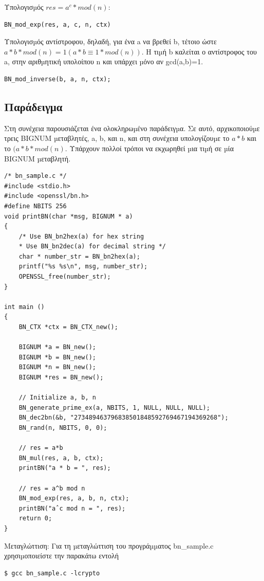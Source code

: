 \noindent
Υπολογισµός \(res = a^c * mod(n):\)
\begin{center}
	\begin{lstlisting}	
BN_mod_exp(res, a, c, n, ctx)	
	\end{lstlisting}	
\end{center}

\noindent
Υπολογισµός αντίστροφου, δηλαδή, για ένα a να βρεθεί b, τέτοιο ώστε \(a * b * mod(n) = 1
(a * b ≡ 1 * mod(n))\). Η τιµή b καλείται ο αντίστροφος του a, στην αριθµητική υπολοίπου
n και υπάρχει µόνο αν gcd(a,b)=1.
\begin{center}
	\begin{lstlisting}	
BN_mod_inverse(b, a, n, ctx);
	\end{lstlisting}	
\end{center}

\subsection{Παράδειγμα}

\noindent
Στη συνέχεια παρουσιάζεται ένα ολοκληρωµένο παράδειγµα. Σε αυτό, αρχικοποιούµε τρεις
BIGNUM µεταβλητές, a, b, και n, και στη συνέχεια υπολογίζουµε το \(a*b\) και το \((a * b * mod(n)\).
Υπάρχουν πολλοί τρόποι να εκχωρηθεί µια τιµή σε µία BIGNUM µεταβλητή.
\begin{center}
	\begin{lstlisting}	
/* bn_sample.c */
#include <stdio.h>
#include <openssl/bn.h>
#define NBITS 256
void printBN(char *msg, BIGNUM * a)
{
	/* Use BN_bn2hex(a) for hex string
	* Use BN_bn2dec(a) for decimal string */
	char * number_str = BN_bn2hex(a);
	printf("%s %s\n", msg, number_str);
	OPENSSL_free(number_str);
}
	
int main ()
{
	BN_CTX *ctx = BN_CTX_new();
	
	BIGNUM *a = BN_new();
	BIGNUM *b = BN_new();
	BIGNUM *n = BN_new();
	BIGNUM *res = BN_new();
	
	// Initialize a, b, n
	BN_generate_prime_ex(a, NBITS, 1, NULL, NULL, NULL);
	BN_dec2bn(&b, "273489463796838501848592769467194369268");
	BN_rand(n, NBITS, 0, 0);
	
	// res = a*b
	BN_mul(res, a, b, ctx);
	printBN("a * b = ", res);
	
	// res = a^b mod n
	BN_mod_exp(res, a, b, n, ctx);
	printBN("aˆc mod n = ", res);
	return 0;
}	
	\end{lstlisting}	
\end{center}

Μεταγλώττιση: Για τη µεταγλώττιση του προγράµµατος bn\_sample.c χρησιµοποιείστε την
παρακάτω εντολή
\begin{center}
	\begin{lstlisting}	
$ gcc bn_sample.c -lcrypto
	\end{lstlisting}	
\end{center}

